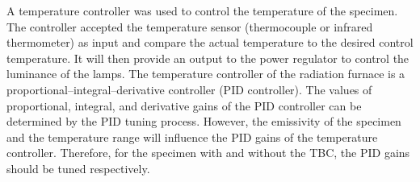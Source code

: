 A temperature controller was used to control the temperature of the specimen.
The controller accepted the temperature sensor (thermocouple or infrared thermometer) as input and compare the actual temperature to the desired control temperature. It will then provide an output to the power regulator to control the luminance of the lamps. 
The temperature controller of the radiation furnace is a proportional–integral–derivative controller (PID controller). The values of proportional, integral, and derivative gains of the PID controller can be determined by the PID tuning process.
However, the emissivity of the specimen and the temperature range will influence the PID gains of the temperature controller. Therefore, for the specimen with and without the TBC, the PID gains should be tuned respectively.










